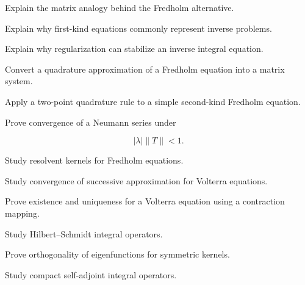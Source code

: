 \begin{exercise}[3]
Explain the matrix analogy behind the Fredholm alternative.
\end{exercise}

\begin{exercise}[3]
Explain why first-kind equations commonly represent inverse problems.
\end{exercise}

\begin{exercise}[3]
Explain why regularization can stabilize an inverse integral equation.
\end{exercise}

\begin{exercise}[3]
Convert a quadrature approximation of a Fredholm equation into a matrix
system.
\end{exercise}

\begin{exercise}[3]
Apply a two-point quadrature rule to a simple second-kind Fredholm
equation.
\end{exercise}

\begin{exercise}[4]
Prove convergence of a Neumann series under

\[
|\lambda|\|T\|<1.
\]
\end{exercise}

\begin{exercise}[4]
Study resolvent kernels for Fredholm equations.
\end{exercise}

\begin{exercise}[4]
Study convergence of successive approximation for Volterra equations.
\end{exercise}

\begin{exercise}[4]
Prove existence and uniqueness for a Volterra equation using a contraction
mapping.
\end{exercise}

\begin{exercise}[4]
Study Hilbert--Schmidt integral operators.
\end{exercise}

\begin{exercise}[4]
Prove orthogonality of eigenfunctions for symmetric kernels.
\end{exercise}

\begin{exercise}[4]
Study compact self-adjoint integral operators.
\end{exercise}

